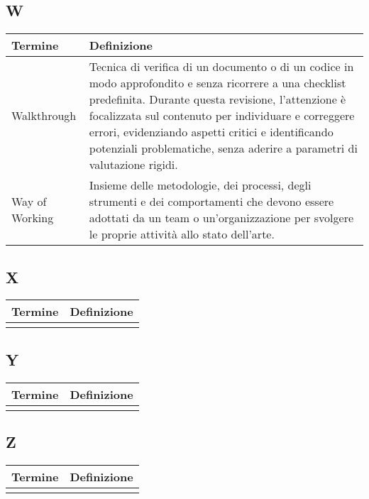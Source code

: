 \documentclass[10pt]{article}
\begin{document}
\subsection{W} %
\begin{longtable}{|>{\centering\arraybackslash}m{2.5cm}|>{\arraybackslash}m{12.5cm}|}
\hline
\rowcolor[gray]{0.8}
\textbf{Termine} & \textbf{Definizione}\\
\endhead
\hline
Walkthrough & Tecnica di verifica di un documento o di un codice in modo approfondito e senza ricorrere a una checklist predefinita. Durante questa revisione, l'attenzione è focalizzata sul contenuto per individuare e correggere errori, evidenziando aspetti critici e identificando potenziali problematiche, senza aderire a parametri di valutazione rigidi.\\
\hline
Way of Working & Insieme delle metodologie, dei processi, degli strumenti e dei comportamenti che devono essere adottati da un team o un'organizzazione per svolgere le proprie attività allo stato dell'arte.\\
\hline
\end{longtable}

\subsection{X} %
\begin{longtable}{|>{\centering\arraybackslash}m{2.5cm}|>{\arraybackslash}m{12.5cm}|}
\hline
\rowcolor[gray]{0.8}
\textbf{Termine} & \textbf{Definizione}\\
\endhead
\hline
 & \\
\hline
\end{longtable}

\subsection{Y} %
\begin{longtable}{|>{\centering\arraybackslash}m{2.5cm}|>{\arraybackslash}m{12.5cm}|}
\hline
\rowcolor[gray]{0.8}
\textbf{Termine} & \textbf{Definizione}\\
\endhead
\hline
 & \\
\hline
\end{longtable}

\subsection{Z} %
\begin{longtable}{|>{\centering\arraybackslash}m{2.5cm}|>{\arraybackslash}m{12.5cm}|}
\hline
\rowcolor[gray]{0.8}
\textbf{Termine} & \textbf{Definizione}\\
\endhead
\hline
 & \\
\hline
\end{longtable}
\end{document}
